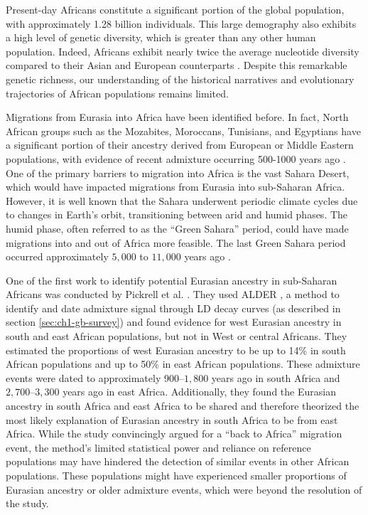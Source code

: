 Present-day Africans constitute a significant portion of the global population, with approximately 1.28 billion individuals.
%
This large demography also exhibits a high level of genetic diversity, which is greater than any other human population.
%
Indeed, Africans exhibit nearly twice the average nucleotide diversity compared to their Asian and European counterparts \cite{yu2002larger}. 
%
Despite this remarkable genetic richness, our understanding of the historical narratives and evolutionary trajectories of African populations remains limited. 


Migrations from Eurasia into Africa have been identified before. 
%
In fact, North African groups such as the Mozabites, Moroccans, Tunisians, and Egyptians have a significant portion of their ancestry derived from European or Middle Eastern populations, with evidence of recent admixture occurring 500-1000 years ago \cite{price2009sensitive, hellenthal2014genetic, salter2019fine}. 
%
One of the primary barriers to migration into Africa is the vast Sahara Desert, which would have impacted migrations from Eurasia into sub-Saharan Africa.
%
However, it is well known that the Sahara underwent periodic climate cycles due to changes in Earth's orbit, transitioning between arid and humid phases. 
%
The humid phase, often referred to as the ``Green Sahara'' period, could have made migrations into and out of Africa more feasible. The last Green Sahara period occurred approximately $5{,}000$ to $11{,}000$ years ago \cite{tierney2017rainfall, larrasoana2013dynamics}.

One of the first work to identify potential Eurasian ancestry in sub-Saharan Africans was conducted by Pickrell et al. \cite{pickrell2012genetic, pickrell2014ancient}.
%
They used ALDER \cite{loh2013inferring}, a method to identify and date admixture signal through LD decay curves (as described in section \ref{sec:ch1-gb-survey}) and found evidence for west Eurasian ancestry in south and east African populations, but not in West or central Africans. 
%
They estimated the proportions of west Eurasian ancestry to be up to 14\% in south African populations and up to 50\% in east African populations. These admixture events were dated to approximately 900–$1{,}800$ years ago in south Africa and $2{,}700$–$3{,}300$ years ago in east Africa. 
%
Additionally, they found the Eurasian ancestry in south Africa and east Africa to be shared and therefore theorized the most likely explanation of Eurasian ancestry in south Africa to be from east Africa.
%
While the study convincingly argued for a ``back to Africa'' migration event, the method's limited statistical power and reliance on reference populations may have hindered the detection of similar events in other African populations. 
%
These populations might have experienced smaller proportions of Eurasian ancestry or older admixture events, which were beyond the resolution of the study.

